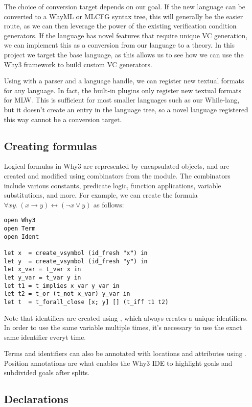 The choice of conversion target depends on our goal.
If the new language can be converted to a WhyML or MLCFG syntax tree,
this will generally be the easier route,
as we can then leverage the power of the existing verification condition generators.
If the language has novel features that require unique VC generation,
we can implement this as a conversion from our language to a theory.
In this project we target the base language,
as this allows us to see how we can use the Why3 framework to build custom VC generators.

Using  with a parser and a language handle,
we can register new textual formats for any language.
In fact, the built-in plugins only register new textual formats for MLW.
This is sufficient for most smaller languages such as our While-lang,
but it doesn't create an entry in the language tree,
so a novel language registered this way cannot be a conversion target.

\subsection{Creating formulas}

Logical formulas in Why3 are represented by encapsulated  objects,
and are created and modified using combinators from the  module.
The combinators include various constants, predicate logic, function applications,
variable substitutions, and more.
For example, we can create the formula
$\forall x y.~(x \rightarrow y) \leftrightarrow (\neg x \lor y)$
as follows:
\begin{lstlisting}
open Why3
open Term
open Ident

let x  = create_vsymbol (id_fresh "x") in
let y  = create_vsymbol (id_fresh "y") in
let x_var = t_var x in
let y_var = t_var y in
let t1 = t_implies x_var y_var in
let t2 = t_or (t_not x_var) y_var in
let t  = t_forall_close [x; y] [] (t_iff t1 t2)
\end{lstlisting}

Note that identifiers are created using ,
which always creates a unique identifiers.
In order to use the same variable multiple times,
it's necessary to use the exact same identifier everyt time.

Terms and identifiers can also be annotated with locations and attributes using
.
Position annotations are what enables the Why3 IDE to highlight goals
and subdivided goals after splits.

\subsection{Declarations}

